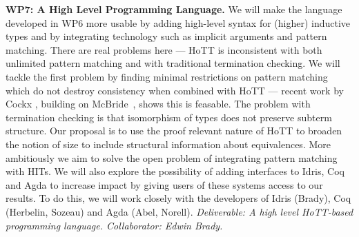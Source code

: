 \documentclass[a4paper,11pt]{article}
\begin{document}
{\bf WP7: A High Level Programming Language.} We will make the
language developed in WP6 more usable by adding high-level syntax for
(higher) inductive types and by integrating technology such as
implicit arguments and pattern matching. There are real problems here
--- HoTT is inconsistent with both unlimited pattern matching and with
traditional termination checking. We will tackle the first problem by
finding minimal restrictions on pattern matching which do not destroy
consistency when combined with HoTT --- recent work by Cockx
\cite{cockx-without-k}, building on McBride~\cite{viewftl}, shows this is feasable. 
The problem with termination checking is that isomorphism of types
does not preserve subterm structure.
Our proposal is to use the proof relevant nature of
HoTT to broaden the notion of size to include structural
information about equivalences. More ambitiously we aim to
solve the open problem of integrating pattern
matching with HITs. We will also explore the possibility of adding
interfaces to Idris, Coq and
Agda to increase impact by giving users of these systems access to
our results. To do this, we will work closely 
with the developers of
Idris (Brady), Coq (Herbelin, Sozeau) and Agda (Abel, Norell). {\em Deliverable: A high level
  HoTT-based
programming language.  Collaborator: Edwin Brady.  
}




\end{document}
